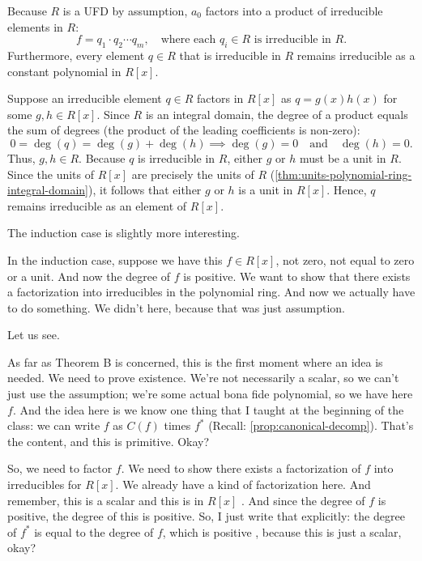 \begin{proofWrapper}
\begin{content}[{Existence: Ground Case \texorpdfstring{($\deg(f) = 0$)}{(deg(f) = 0)}}]
Because $R$ is a UFD by assumption, $a_0$ factors into a product of irreducible elements in $R$:
\[
f = q_1 \cdot q_2 \cdots q_m, \quad \text{where each } q_i \in R \text{ is irreducible in } R.
\]
Furthermore, every element $q \in R$ that is irreducible in $R$ remains irreducible as a constant polynomial in $R[x]$.

\begin{steps}
Suppose an irreducible element $q \in R$ factors in $R[x]$ as $q = g(x) h(x)$ for some $g, h \in R[x]$.
Since $R$ is an integral domain, the degree of a product equals the sum of degrees (the product of the leading coefficients is non-zero):
\[
0 = \deg(q) = \deg(g) + \deg(h) \implies \deg(g) = 0 \quad \text{and} \quad \deg(h) = 0.
\]
Thus, $g, h \in R$. Because $q$ is irreducible in $R$, either $g$ or $h$ must be a unit in $R$. Since the units of $R[x]$ are precisely the units of $R$ (\cref{thm:units-polynomial-ring-integral-domain}), it follows that either $g$ or $h$ is a unit in $R[x]$. Hence, $q$ remains irreducible as an element of $R[x]$.
\end{steps}
\end{content}

\begin{speech}[00:23:58 - 00:25:57]
The induction case is slightly more interesting.

In the induction case, suppose we have this $f \in R[x]$, not zero, not equal to zero or a unit.  And now the degree of $f$ is positive. We want to show that there exists a factorization into irreducibles in the polynomial ring. And now we actually have to do something. We didn't here, because that was just assumption.

Let us see.

As far as Theorem B is concerned, this is the first moment where an idea is needed. We need to prove existence. We're not necessarily a scalar, so we can't just use the assumption; we're some actual bona fide polynomial, so we have here $f$. And the idea here is we know one thing that I taught at the beginning of the class: we can write $f$ as $C(f)$ times $f^*$ (Recall: \cref{prop:canonical-decomp}).  That's the content, and this is primitive.  Okay?

So, we need to factor $f$. We need to show there exists a factorization of $f$ into irreducibles for $R[x]$. We already have a kind of factorization here. And remember, this is a scalar  and this is in $R[x]$ . And since the degree of $f$ is positive, the degree of this is positive. So, I just write that explicitly: the degree of $f^*$ is equal to the degree of $f$, which is positive , because this is just a scalar, okay?


\end{speech}
\end{proofWrapper}
